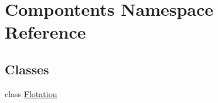\hypertarget{namespace_compontents}{}\section{Compontents Namespace Reference}
\label{namespace_compontents}
\subsection*{Classes}
\begin{DoxyCompactItemize}
\item 
class \mbox{\hyperlink{class_compontents_1_1_flotation}{Flotation}}
\end{DoxyCompactItemize}
